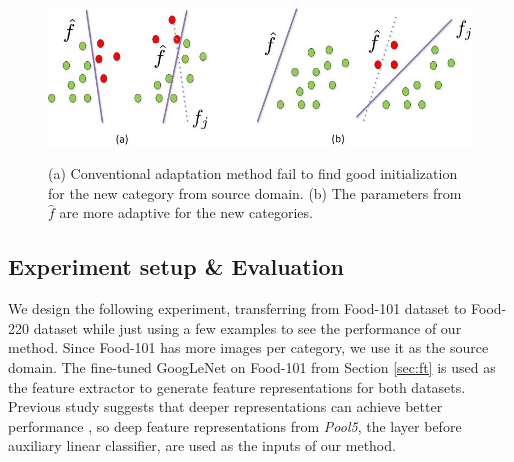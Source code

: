 \begin{figure}
  \centering
  \includegraphics[scale = .6]{fig/domain.jpg}\\
  \caption{(a) Conventional adaptation method fail to find good initialization for the new category from source domain. (b) The parameters from $\hat{f}$ are more adaptive for the new categories.}
  \label{fig:wm}
\end{figure}

\subsection{Experiment setup \& Evaluation}
We design the following experiment, transferring from Food-101 dataset to Food-220 dataset while just using a few examples to see the performance of our method. Since Food-101 has more images per category, we use it as the source domain. The fine-tuned GoogLeNet on Food-101 from Section \ref{sec:ft} is used as the feature extractor to generate feature representations for both datasets. Previous study suggests that deeper representations can achieve better performance \cite{hoffman2013one}, so deep feature representations from \emph{Pool5}, the layer before auxiliary linear classifier, are used as the inputs of our method.


